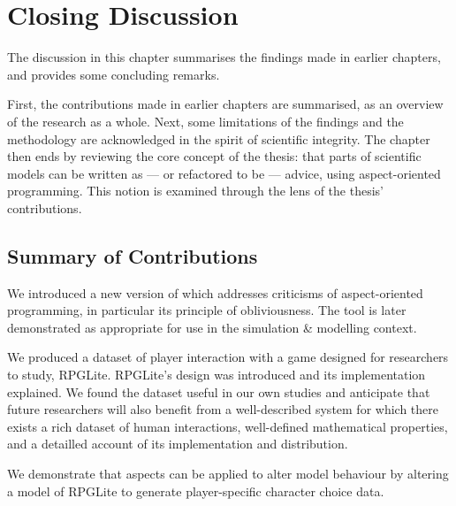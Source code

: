 \chapter{Closing Discussion}\label{chap:closing_discussion}

The discussion in this chapter summarises the findings made in earlier
chapters, and provides some concluding remarks.

First, the contributions made in earlier chapters are summarised, as an overview
of the research as a whole. Next, some limitations of the findings and the
methodology are acknowledged in the spirit of scientific integrity. The chapter
then ends by reviewing the core concept of the thesis: that parts of scientific
models can be written as --- or refactored to be --- advice, using
aspect-oriented programming. This notion is examined through the lens of the
thesis' contributions.



\section{Summary of Contributions}
\label{conclusion:contributions}


We introduced a new version of \pdsf which addresses criticisms of
aspect-oriented programming, in particular its principle of obliviousness. The
tool is later demonstrated as appropriate for use in the simulation \& modelling
context.

We produced a dataset of player interaction with a game designed for researchers
to study, RPGLite. RPGLite's design was introduced and its implementation
explained. We found the dataset useful in our own studies and anticipate that
future researchers will also benefit from a well-described \sociotechnical
system for which there exists a rich dataset of human interactions, well-defined
mathematical properties, and a detailled account of its implementation and
distribution.

We demonstrate that aspects can be applied to alter model behaviour by
altering a model of RPGLite to generate player-specific character choice data.

